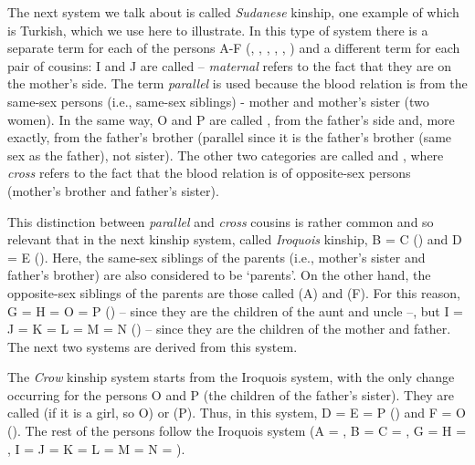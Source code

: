 \begin{refsection}
The next system we talk about is called \emph{Sudanese} kinship, one example of which is Turkish, which we use here to illustrate. In this type of system there is a separate term for each of the persons A-F (, , , , , ) and a different term for each pair of cousins: I and J are called  – \textit{maternal} refers to the fact that they are on the mother's side. The term \textit{parallel} is used because the blood relation is from the same-sex persons (i.e., same-sex siblings) - mother and mother's sister (two women). In the same way, O and P are called , from the father's side and, more exactly, from the father's brother (parallel since it is the father's brother (same sex as the father), not sister). The other two categories are called  and , where \textit{cross} refers to the fact that the blood relation is of opposite-sex persons (mother's brother and father's sister).

This distinction between \textit{parallel} and \textit{cross} cousins is rather common and so relevant that in the next kinship system, called \emph{Iroquois} kinship, B = C () and D = E (). Here, the same-sex siblings of the parents (i.e., mother's sister and father's brother) are also considered to be `parents'. On the other hand, the opposite-sex siblings of the parents are those called  (A) and  (F). For this reason, G = H = O = P () -- since they are the children of the aunt and uncle --, but I = J = K = L = M = N () – since they are the children of the mother and father. The next two systems are derived from this system.

\begin{sloppypar}
The \emph{Crow} kinship system starts from the Iroquois system, with the only change occurring for the persons O and P (the children of the father's sister). They are called  (if it is a girl, so O) or  (P). Thus, in this system, D = E = P () and F = O (). The rest of the persons follow the Iroquois system (A = , B = C = , G = H = , I = J = K = L = M = N = ).
\end{sloppypar}


\end{refsection}
